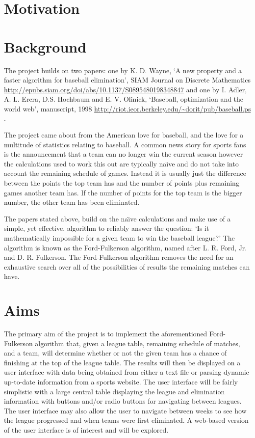 \section{Motivation}

\section{Background}

The project builds on two papers: one by K. D. Wayne, `A new property and a 
faster algorithm for baseball elimination', SIAM Journal on Discrete 
Mathematics \url{http://epubs.siam.org/doi/abs/10.1137/S0895480198348847}
\cite{Wayne} and one by I. Adler, A. L. Erera, D.S. Hochbaum and E. V. Olinick,
`Baseball, optimization and the world web', manuscript, 1998
\url{http://riot.ieor.berkeley.edu/~dorit/pub/baseball.ps} \cite{Adler}.

The project came about from the American love for baseball, and the love for
a multitude of statistics relating to baseball. A common news story for sports
fans is the announcement that a team can no longer win the current season
however the calculations used to work this out are typically na\"{\i}ve and
do not take into account the remaining schedule of games. Instead it is
usually just the difference between the points the top team has and the number
of points plus remaining games another team has. If the number of points
for the top team is the bigger number, the other team has been eliminated.

The papers stated above, build on the na\"{\i}ve calculations and make use of a
simple, yet effective, algorithm to reliably answer the question:
`Is it mathematically impossible for a given team to win the baseball league?'
The algorithm is known as the Ford-Fulkerson algorithm, named after L. R. Ford,
Jr. and D. R. Fulkerson. The Ford-Fulkerson algorithm removes the need for an
exhaustive search over all of the possibilities of results the remaining
matches can have.

\section{Aims}

The primary aim of the project is to implement the aforementioned
Ford-Fulkerson algorithm that, given a league table, remaining schedule of
matches, and a team, will determine whether or not the given team has a
chance of finishing at the top of the league table. The results will then
be displayed on a user interface with data being obtained from either a text
file or parsing dynamic up-to-date information from a sports website. The user
interface will be fairly simplistic with a large central table displaying the 
league and elimination information with buttons and/or radio buttons for 
navigating between leagues. The user interface may also allow the user to 
navigate between weeks to see how the league progressed and when teams were 
first eliminated. A web-based version of the user interface is of interest and 
will be explored.

